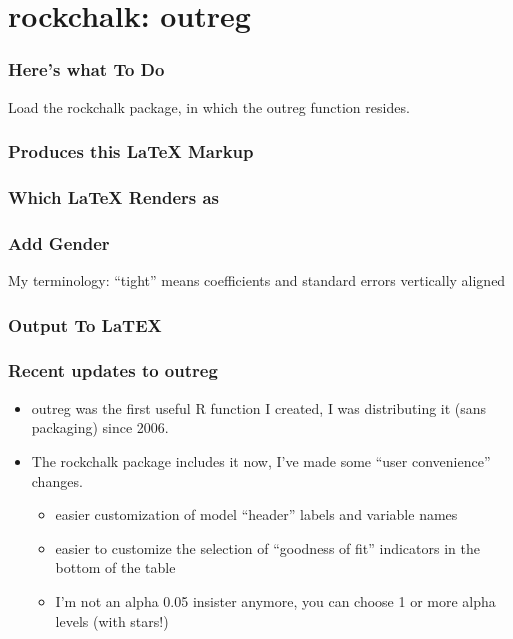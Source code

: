 \documentclass[11pt,english]{beamer}
\def\lyxframeend{} %
\begin{document}
\lyxframeend{}\section{rockchalk: outreg}

\begin{frame}[containsverbatim]
\frametitle{Here's what To Do}

Load the rockchalk package, in which the outreg function resides.





\end{frame}

\begin{frame}[containsverbatim]
\frametitle{Produces this LaTeX Markup}




\end{frame}

\begin{frame}[containsverbatim]
\frametitle{Which LaTeX Renders as}



\end{frame}

\begin{frame}[containsverbatim]
\frametitle{Add Gender}




My terminology: ``tight'' means coefficients and standard errors
vertically aligned

\end{frame}

\begin{frame}[containsverbatim]
\frametitle{Output To LaTEX}



\end{frame}

\begin{frame}[containsverbatim]
\frametitle{Recent updates to outreg}
\begin{itemize}
\item outreg was the first useful R function I created, I was distributing
it (sans packaging) since 2006.
\item The rockchalk package includes it now, I've made some ``user convenience''
changes.

\begin{itemize}
\item easier customization of model ``header'' labels and variable names
\item easier to customize the selection of ``goodness of fit'' indicators
in the bottom of the table
\item I'm not an alpha 0.05 insister anymore, you can choose 1 or more alpha
levels (with stars!)
\end{itemize}
\end{itemize}
\end{frame}
\end{document}
